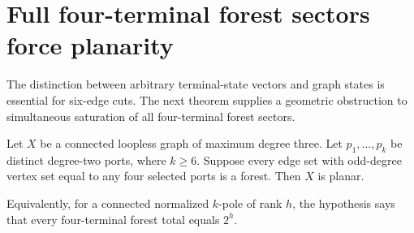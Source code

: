 \section{Full four-terminal forest sectors force planarity}
\label{sec:path-six-four-sector-planarity}

The distinction between arbitrary terminal-state vectors and graph states is essential for six-edge cuts.
The next theorem supplies a geometric obstruction to simultaneous saturation of all four-terminal forest sectors.

\begin{theorem}
\label{thm:path-six-full-four-planar}
Let $X$ be a connected loopless graph of maximum degree three.
Let $p_1,\ldots,p_k$ be distinct degree-two ports, where $k\ge6$.
Suppose every edge set with odd-degree vertex set equal to any four selected ports is a forest.
Then $X$ is planar.

Equivalently, for a connected normalized $k$-pole of rank $h$, the hypothesis says that every four-terminal forest total equals $2^h$.
\end{theorem}

